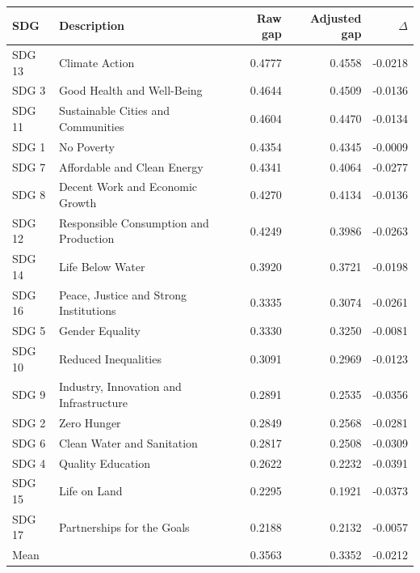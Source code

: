 \begin{tabular}{llrrr}
\toprule
SDG & Description & Raw gap & Adjusted gap & $\Delta$ \\
\midrule
SDG 13 & Climate Action & 0.4777 & 0.4558 & -0.0218 \\
SDG  3 & Good Health and Well-Being & 0.4644 & 0.4509 & -0.0136 \\
SDG 11 & Sustainable Cities and Communities & 0.4604 & 0.4470 & -0.0134 \\
SDG  1 & No Poverty & 0.4354 & 0.4345 & -0.0009 \\
SDG  7 & Affordable and Clean Energy & 0.4341 & 0.4064 & -0.0277 \\
SDG  8 & Decent Work and Economic Growth & 0.4270 & 0.4134 & -0.0136 \\
SDG 12 & Responsible Consumption and Production & 0.4249 & 0.3986 & -0.0263 \\
SDG 14 & Life Below Water & 0.3920 & 0.3721 & -0.0198 \\
SDG 16 & Peace, Justice and Strong Institutions & 0.3335 & 0.3074 & -0.0261 \\
SDG  5 & Gender Equality & 0.3330 & 0.3250 & -0.0081 \\
SDG 10 & Reduced Inequalities & 0.3091 & 0.2969 & -0.0123 \\
SDG  9 & Industry, Innovation and Infrastructure & 0.2891 & 0.2535 & -0.0356 \\
SDG  2 & Zero Hunger & 0.2849 & 0.2568 & -0.0281 \\
SDG  6 & Clean Water and Sanitation & 0.2817 & 0.2508 & -0.0309 \\
SDG  4 & Quality Education & 0.2622 & 0.2232 & -0.0391 \\
SDG 15 & Life on Land & 0.2295 & 0.1921 & -0.0373 \\
SDG 17 & Partnerships for the Goals & 0.2188 & 0.2132 & -0.0057 \\
\midrule
\multicolumn{2}{l}{Mean} & 0.3563 & 0.3352 & -0.0212 \\
\bottomrule
\end{tabular}
